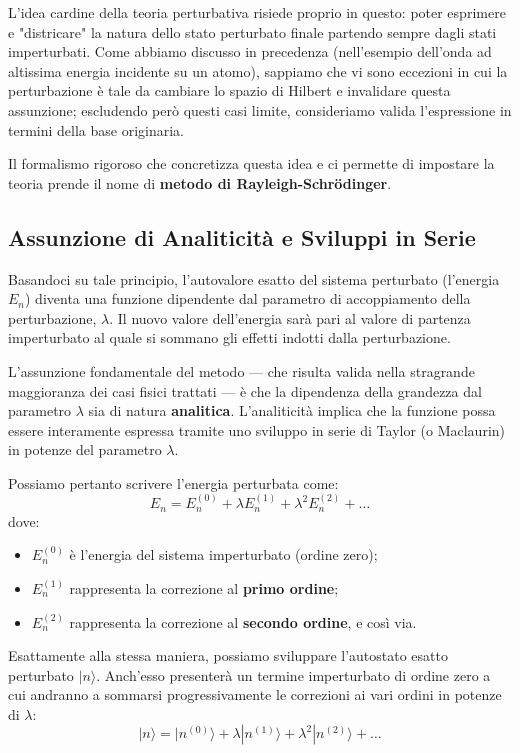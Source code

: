 L'idea cardine della teoria perturbativa risiede proprio in questo: poter esprimere e "districare" la natura dello stato perturbato finale partendo sempre dagli stati imperturbati. Come abbiamo discusso in precedenza (nell'esempio dell'onda ad altissima energia incidente su un atomo), sappiamo che vi sono eccezioni in cui la perturbazione è tale da cambiare lo spazio di Hilbert e invalidare questa assunzione; escludendo però questi casi limite, consideriamo valida l'espressione in termini della base originaria.

Il formalismo rigoroso che concretizza questa idea e ci permette di impostare la teoria prende il nome di \textbf{metodo di Rayleigh-Schrödinger}.

\subsection{Assunzione di Analiticità e Sviluppi in Serie}
Basandoci su tale principio, l'autovalore esatto del sistema perturbato (l'energia $E_n$) diventa una funzione dipendente dal parametro di accoppiamento della perturbazione, $\lambda$. Il nuovo valore dell'energia sarà pari al valore di partenza imperturbato al quale si sommano gli effetti indotti dalla perturbazione.

L'assunzione fondamentale del metodo — che risulta valida nella stragrande maggioranza dei casi fisici trattati — è che la dipendenza della grandezza dal parametro $\lambda$ sia di natura \textbf{analitica}. L'analiticità implica che la funzione possa essere interamente espressa tramite uno sviluppo in serie di Taylor (o Maclaurin) in potenze del parametro $\lambda$.

Possiamo pertanto scrivere l'energia perturbata come:
\begin{equation}
E_n = E_n^{(0)} + \lambda E_n^{(1)} + \lambda^2 E_n^{(2)} + \dots
\end{equation}
dove:
\begin{itemize}
\item $E_n^{(0)}$ è l'energia del sistema imperturbato (ordine zero);
\item $E_n^{(1)}$ rappresenta la correzione al \textbf{primo ordine};
\item $E_n^{(2)}$ rappresenta la correzione al \textbf{secondo ordine}, e così via.
\end{itemize}

Esattamente alla stessa maniera, possiamo sviluppare l'autostato esatto perturbato $\vert{}n\rangle$. Anch'esso presenterà un termine imperturbato di ordine zero a cui andranno a sommarsi progressivamente le correzioni ai vari ordini in potenze di $\lambda$:
\begin{equation}
|n\rangle = |n^{(0)}\rangle + \lambda |n^{(1)}\rangle + \lambda^2 |n^{(2)}\rangle + \dots
\end{equation}

